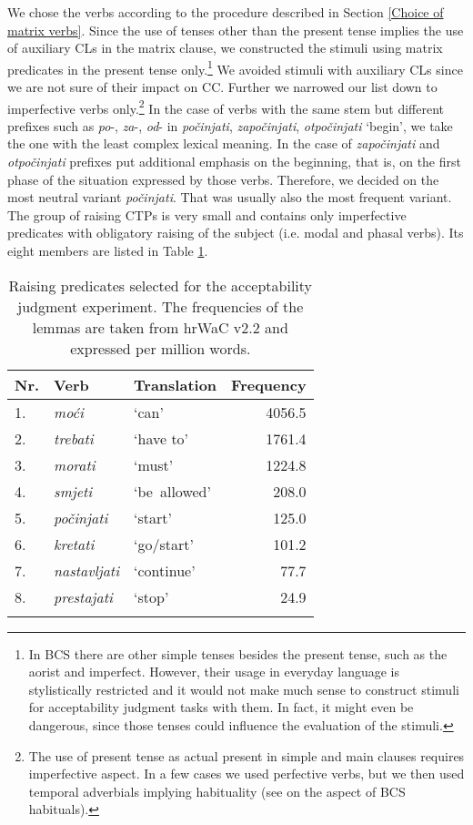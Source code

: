 We chose the verbs according to the procedure described in Section \ref{Choice of matrix verbs}.
Since the use of tenses other than the present tense implies the use of auxiliary CLs in the matrix clause, we constructed the stimuli using matrix predicates in the present tense only.\footnote{In BCS there are other simple tenses besides the present tense, such as the aorist and imperfect. However, their usage in everyday language is stylistically restricted and it would not make much sense to construct stimuli for acceptability judgment tasks with them. In fact, it might even be dangerous, since those tenses could influence the evaluation of the stimuli.} We avoided stimuli with auxiliary CLs since we are not sure of their impact on CC. Further we narrowed our list down to imperfective verbs only.\footnote{The use of present tense as actual present in simple and main clauses requires imperfective aspect. In a few cases we used perfective verbs, but we then used temporal adverbials implying habituality (see \cite{Dickey00} on the aspect of BCS habituals).} In the case of verbs with the same stem but different prefixes such as \textit{po}-, \textit{za}-, \textit{od}- in \textit{počinjati}, \textit{započinjati}, \textit{otpočinjati} ‘begin’, we take the one with the least complex lexical meaning. In the case of \textit{započinjati} and \textit{otpočinjati} prefixes put additional emphasis on the beginning, that is, on the first phase of the situation expressed by those verbs. Therefore, we decided on the most neutral variant \textit{počinjati}. That was usually also the most frequent variant. The group of raising CTPs is very small and contains only imperfective predicates with obligatory raising of the subject (i.e. modal and phasal verbs). Its eight members are listed in Table \ref{T16.1}.


\begin{table}
\caption{Raising predicates selected for the acceptability judgment experiment. The frequencies of the lemmas are taken from hrWaC v2.2 and expressed per million words.\label{T16.1}}
\begin{tabular}{lllr}
\lsptoprule
Nr.&Verb&Translation&Frequency\\\midrule
1.& \textit{moći} & ‘can’ &4056.5 \\
2.& \textit{trebati} & ‘have to’ & 1761.4 \\
3.& \textit{morati} & ‘must’ & 1224.8 \\
4.& \textit{smjeti} & \mbox{‘be allowed’} & 208.0 \\
5.& \textit{počinjati} & ‘start’ & 125.0 \\
6.& \textit{kretati} & \mbox{‘go/start’} & 101.2 \\
7.& \textit{nastavljati} & \mbox{‘continue’} & 77.7 \\
8.& \textit{prestajati} & ‘stop’ & 24.9 \\
\lspbottomrule
\end{tabular}
\end{table}


